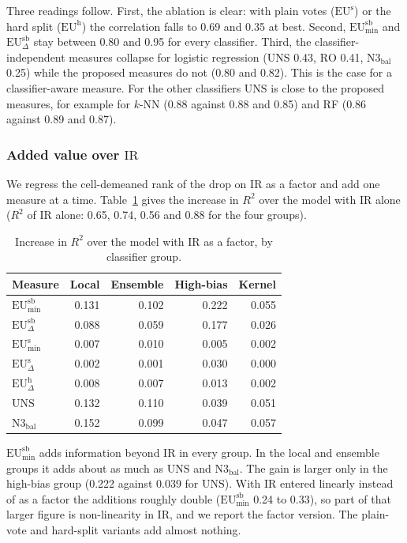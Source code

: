 \documentclass[preprint,12pt]{elsarticle}
\newcommand{\EUmin}[1]{\mathrm{EU}^{\mathrm{#1}}_{\min}}
\newcommand{\EUdif}[1]{\mathrm{EU}^{\mathrm{#1}}_{\Delta}}
\newcommand{\IR}{\mathrm{IR}}
\newcommand{\UNS}{\mathrm{UNS}}
\newcommand{\RO}{\mathrm{RO}}
\newcommand{\Nbal}{\mathrm{N3}_{\mathrm{bal}}}
\begin{document}
Three readings follow. First, the ablation is clear: with plain votes ($\mathrm{EU}^{\mathrm{s}}$) or the hard split ($\mathrm{EU}^{\mathrm{h}}$) the correlation falls to 0.69 and 0.35 at best. Second, $\EUmin{sb}$ and $\EUdif{sb}$ stay between 0.80 and 0.95 for every classifier. Third, the classifier-independent measures collapse for logistic regression ($\UNS$ 0.43, $\RO$ 0.41, $\Nbal$ 0.25) while the proposed measures do not (0.80 and 0.82). This is the case for a classifier-aware measure. For the other classifiers $\UNS$ is close to the proposed measures, for example for $k$-NN (0.88 against 0.88 and 0.85) and RF (0.86 against 0.89 and 0.87).

\subsubsection{Added value over $\IR$}
We regress the cell-demeaned rank of the drop on $\IR$ as a factor and add one measure at a time. Table~\ref{tab:r2} gives the increase in $R^2$ over the model with $\IR$ alone ($R^2$ of $\IR$ alone: 0.65, 0.74, 0.56 and 0.88 for the four groups).

\begin{table}[H]
\centering
\caption{Increase in $R^2$ over the model with $\IR$ as a factor, by classifier group.}\label{tab:r2}
\begin{tabular}{lrrrr}
\toprule
Measure & Local & Ensemble & High-bias & Kernel \\
\midrule
$\EUmin{sb}$ & 0.131 & 0.102 & 0.222 & 0.055 \\
$\EUdif{sb}$ & 0.088 & 0.059 & 0.177 & 0.026 \\
$\EUmin{s}$ & 0.007 & 0.010 & 0.005 & 0.002 \\
$\EUdif{s}$ & 0.002 & 0.001 & 0.030 & 0.000 \\
$\EUdif{h}$ & 0.008 & 0.007 & 0.013 & 0.002 \\
$\UNS$ & 0.132 & 0.110 & 0.039 & 0.051 \\
$\Nbal$ & 0.152 & 0.099 & 0.047 & 0.057 \\
\bottomrule
\end{tabular}
\end{table}

$\EUmin{sb}$ adds information beyond $\IR$ in every group. In the local and ensemble groups it adds about as much as $\UNS$ and $\Nbal$. The gain is larger only in the high-bias group (0.222 against 0.039 for $\UNS$). With $\IR$ entered linearly instead of as a factor the additions roughly double ($\EUmin{sb}$ 0.24 to 0.33), so part of that larger figure is non-linearity in $\IR$, and we report the factor version. The plain-vote and hard-split variants add almost nothing.
\end{document}
